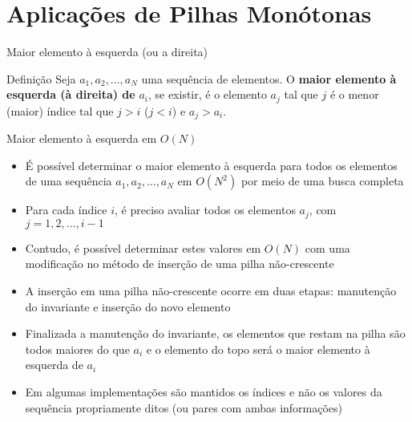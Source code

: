 \section{Aplicações de Pilhas Monótonas}

\begin{frame}[fragile]{Maior elemento à esquerda (ou a direita)}

    \begin{block}{Definição}
        Seja $a_1, a_2, \ldots, a_N$ uma sequência de elementos. O \textbf{maior elemento à esquerda (à direita) de} $a_i$, se existir, é o elemento $a_j$ tal que $j$ é o menor (maior) índice tal que $j > i$
        ($j < i$) e $a_j > a_i$.
    \end{block}

\end{frame}

\begin{frame}[fragile]{Maior elemento à esquerda em $O(N)$}

    \begin{itemize}
        \item É possível determinar o maior elemento à esquerda para todos os elementos de uma
            sequência $a_1, a_2, \ldots, a_N$ em $O(N^2)$ por meio de uma busca completa

        \item Para cada índice $i$, é preciso avaliar todos os elementos $a_j$, com $j = 1, 2, \ldots, i -1$

        \item Contudo, é possível determinar estes valores em $O(N)$ com uma modificação no método de
            inserção de uma pilha não-crescente

        \item A inserção em uma pilha não-crescente ocorre em duas etapas: manutenção do invariante e
            inserção do novo elemento

        \item Finalizada a manutenção do invariante, os elementos que restam na pilha são todos maiores
            do que $a_i$ e o elemento do topo será o maior elemento à esquerda de $a_i$

        \item Em algumas implementações são mantidos os índices e não os valores da sequência
            propriamente ditos (ou pares com ambas informações)
    \end{itemize}
\end{frame}


